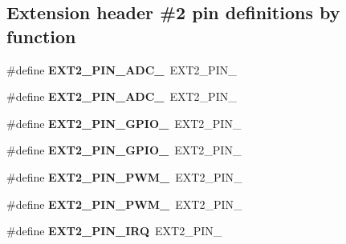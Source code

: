 \subsection*{Extension header \#2 pin definitions by function}
\begin{DoxyCompactItemize}
\item 
\hypertarget{group__saml21__xplained__pro__features__group_ga7ef96b70de24c438e1d8599aed047afa}{}\#define {\bfseries E\+X\+T2\+\_\+\+P\+I\+N\+\_\+\+A\+D\+C\+\_}~E\+X\+T2\+\_\+\+P\+I\+N\+\_\label{group__saml21__xplained__pro__features__group_ga7ef96b70de24c438e1d8599aed047afa}

\item 
\hypertarget{group__saml21__xplained__pro__features__group_gab3b8dfec060b4a077603a27e8c603a94}{}\#define {\bfseries E\+X\+T2\+\_\+\+P\+I\+N\+\_\+\+A\+D\+C\+\_}~E\+X\+T2\+\_\+\+P\+I\+N\+\_\label{group__saml21__xplained__pro__features__group_gab3b8dfec060b4a077603a27e8c603a94}

\item 
\hypertarget{group__saml21__xplained__pro__features__group_ga5f54bd174047d0d8edaf586b61f65c63}{}\#define {\bfseries E\+X\+T2\+\_\+\+P\+I\+N\+\_\+\+G\+P\+I\+O\+\_}~E\+X\+T2\+\_\+\+P\+I\+N\+\_\label{group__saml21__xplained__pro__features__group_ga5f54bd174047d0d8edaf586b61f65c63}

\item 
\hypertarget{group__saml21__xplained__pro__features__group_gaf648c02c3ac7022386a3d594031c91c8}{}\#define {\bfseries E\+X\+T2\+\_\+\+P\+I\+N\+\_\+\+G\+P\+I\+O\+\_}~E\+X\+T2\+\_\+\+P\+I\+N\+\_\label{group__saml21__xplained__pro__features__group_gaf648c02c3ac7022386a3d594031c91c8}

\item 
\hypertarget{group__saml21__xplained__pro__features__group_ga15df54ae8400cddf7a8c6b87710af422}{}\#define {\bfseries E\+X\+T2\+\_\+\+P\+I\+N\+\_\+\+P\+W\+M\+\_}~E\+X\+T2\+\_\+\+P\+I\+N\+\_\label{group__saml21__xplained__pro__features__group_ga15df54ae8400cddf7a8c6b87710af422}

\item 
\hypertarget{group__saml21__xplained__pro__features__group_ga1ee67a82e37423527e9a7438e2a2d5f4}{}\#define {\bfseries E\+X\+T2\+\_\+\+P\+I\+N\+\_\+\+P\+W\+M\+\_}~E\+X\+T2\+\_\+\+P\+I\+N\+\_\label{group__saml21__xplained__pro__features__group_ga1ee67a82e37423527e9a7438e2a2d5f4}

\item 
\hypertarget{group__saml21__xplained__pro__features__group_gaf6221991474f801dbf1976dba2dca985}{}\#define {\bfseries E\+X\+T2\+\_\+\+P\+I\+N\+\_\+\+I\+R\+Q}~E\+X\+T2\+\_\+\+P\+I\+N\+\_\label{group__saml21__xplained__pro__features__group_gaf6221991474f801dbf1976dba2dca985}


\end{DoxyCompactItemize}
